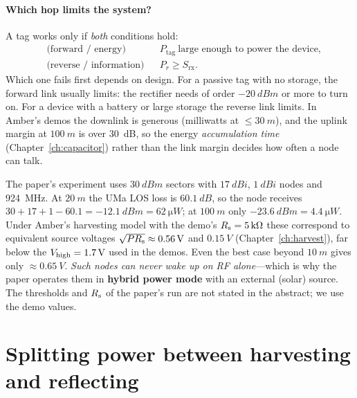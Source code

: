 \paragraph{Which hop limits the system?}
A tag works only if \emph{both} conditions hold:
\begin{align*}
 &\text{(forward / energy)} && P_{\mathrm{tag}}\ \text{large enough to power the device,}\\
 &\text{(reverse / information)} && P_r\ge S_{\mathrm{rx}}.
\end{align*}
Which one fails first depends on design. For a passive tag with no storage, the
forward link usually limits: the rectifier needs of order $\SI{-20}{dBm}$ or more to
turn on. For a device with a battery or large storage the reverse
link limits. In Amber's demos the downlink is generous (milliwatts at $\le\SI{30}{m}$),
and the uplink margin at $\SI{100}{m}$ is over $30$~dB, so the energy
\emph{accumulation time} (Chapter~\ref{ch:capacitor}) rather than the link margin
decides how often a node can talk.

\begin{example}
The paper's experiment uses $\SI{30}{dBm}$ sectors with $\SI{17}{dBi}$, $\SI{1}{dBi}$ nodes and 924~MHz.
At $\SI{20}{m}$ the UMa LOS loss is $\SI{60.1}{dB}$, so the node receives
$30+17+1-60.1=\SI{-12.1}{dBm}=\SI{62}{\micro W}$; at $\SI{100}{m}$ only $\SI{-23.6}{dBm}=\SI{4.4}{\micro W}$.
Under Amber's harvesting model with the demo's $R_{\mathrm{s}}=\SI{5}{k\ohm}$ these correspond to
equivalent source voltages $\sqrt{PR_{\mathrm{s}}}\approx\SI{0.56}{V}$ and $\SI{0.15}{V}$
(Chapter~\ref{ch:harvest}), far below the $V_{\mathrm{high}}=\SI{1.7}{V}$ used in the demos.
Even the best case beyond $\SI{10}{m}$ gives only $\approx\SI{0.65}{V}$. \emph{Such
nodes can never wake up on RF alone}---which is why the paper operates them in
\textbf{hybrid power mode} with an external (solar) source. The thresholds and
$R_{\mathrm{s}}$ of the paper's run are not stated in the abstract; we use the demo values.
\end{example}

\section{Splitting power between harvesting and reflecting}
\label{sec:split}

